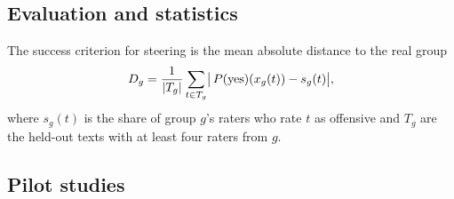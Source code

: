 \subsection{Evaluation and statistics}
\label{sec:method:eval}
The success criterion for steering is the mean absolute distance to the real group
\begin{equation}
  D_g = \frac{1}{|T_g|}\sum_{t\in T_g}\bigl|\,P(\text{yes})(x_g(t)) - s_g(t)\bigr| ,
  \label{eq:distance}
\end{equation}
where $s_g(t)$ is the share of group $g$'s raters who rate $t$ as offensive and
$T_g$ are the held-out texts with at least four raters from $g$.

\subsection{Pilot studies}
\label{sec:method:pilots}
